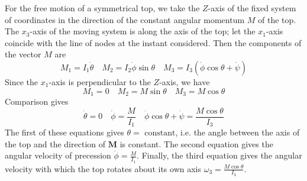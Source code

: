 \documentclass[cyan]{elegantnote}
\begin{document}
For the free motion of a symmetrical top, we take the $Z$-axis of the fixed system of coordinates in the direction of the constant angular momentum $M$ of the top. The $x_3$-axis of the moving system is along the axis of the top; let the $x_1$-axis coincide with the line of nodes at the instant considered. 
Then the components of the vector $M$ are
\[M_1 = I_1\dot{\theta} \quad M_2 = I_2 \dot{\phi}\sin\theta \quad M_3 = I_3(\dot{\phi}\cos\theta + \dot{\psi})\]
Since the $x_1$-axis is perpendicular to the $Z$-axis, we have
\[M_1 = 0 \quad M_2 = M\sin\theta \quad M_3 = M\cos\theta\]
Comparison gives
\[\dot{\theta} = 0 \quad  \dot{\phi} = \frac{M}{I_1} \quad \dot{\phi}\cos\theta + \dot{\psi} = \frac{M\cos\theta}{I_3}\]
The first of these equations gives $\theta = \mbox{ constant} $, i.e. the angle between the axis of the top and the direction of $\bm{M}$ is constant. The second equation gives
the angular velocity of precession $\dot{\phi} = \frac{M}{I_1}$. Finally, the third equation gives the angular velocity with which the top rotates about its own axis $\omega_3 = \frac{M\cos\theta}{I_3}$.
\end{document}
